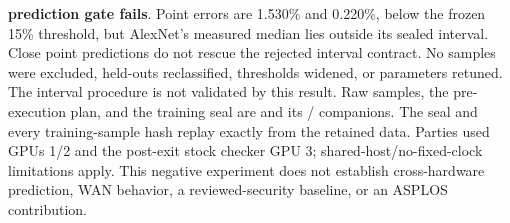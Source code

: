 \documentclass[11pt]{article}
\begin{document}
\textbf{prediction gate fails}. Point errors are 1.530\% and 0.220\%, below
the frozen 15\% threshold, but AlexNet's measured median lies outside its
sealed interval. Close point predictions do not rescue the rejected interval
contract. No samples were excluded, held-outs reclassified, thresholds widened,
or parameters retuned. The interval procedure is not validated by this result.
Raw samples, the pre-execution plan, and the training seal are
and its / companions. The seal and every
training-sample hash replay exactly from the retained data. Parties used GPUs
1/2 and the post-exit stock checker GPU 3; shared-host/no-fixed-clock limitations
apply. This negative experiment does not establish cross-hardware prediction,
WAN behavior, a reviewed-security baseline, or an ASPLOS contribution.
\end{document}

